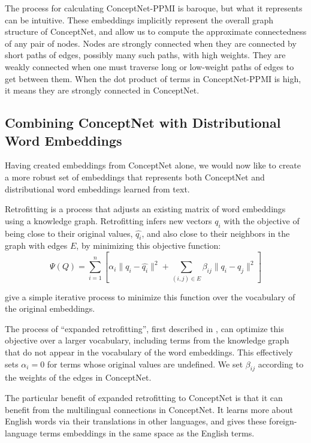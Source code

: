 \documentclass[letterpaper]{article}
\begin{document}
The process for calculating ConceptNet-PPMI is baroque, but what it represents
can be intuitive. These embeddings implicitly represent the overall graph
structure of ConceptNet, and allow us to compute the approximate connectedness
of any pair of nodes. Nodes are strongly connected when they are connected by
short paths of edges, possibly many such paths, with high weights. They are
weakly connected when one must traverse long or low-weight paths of edges to
get between them. When the dot product of terms in ConceptNet-PPMI is high, it
means they are strongly connected in ConceptNet.

\subsection{Combining ConceptNet with Distributional Word Embeddings}

Having created embeddings from ConceptNet alone, we would now like to create
a more robust set of embeddings that represents both ConceptNet and distributional
word embeddings learned from text.

Retrofitting \cite{faruqui2015retrofitting} is a process that adjusts an
existing matrix of word embeddings using a knowledge graph. Retrofitting
infers new vectors $q_i$ with the objective of being close to their original
values, $\hat{q_i}$, and also close to their neighbors in the graph with edges $E$,
by minimizing this objective function:
$$\Psi(Q) = \sum_{i=1}^{n}\left[
    \alpha_i \lVert q_i - \hat{q_i} \rVert ^2 + \sum_{(i, j) \in E} \beta_{ij} \lVert q_i - q_j \rVert ^2
\right] $$

\citeauthor{faruqui2015retrofitting} give a simple iterative process to minimize
this function over the vocabulary of the original embeddings.

The process of ``expanded retrofitting'', first described in
\cite{speer2016ensemble}, can optimize this objective over a larger vocabulary,
including terms from the knowledge graph that do not appear in the vocabulary
of the word embeddings. This effectively sets $\alpha_i = 0$ for terms whose
original values are undefined. We set $\beta_{ij}$ according to the weights
of the edges in ConceptNet.

The particular benefit of expanded retrofitting to ConceptNet is that it can
benefit from the multilingual connections in ConceptNet. It learns more about
English words via their translations in other languages, and gives these
foreign-language terms embeddings in the same space as the English terms.
\end{document}
